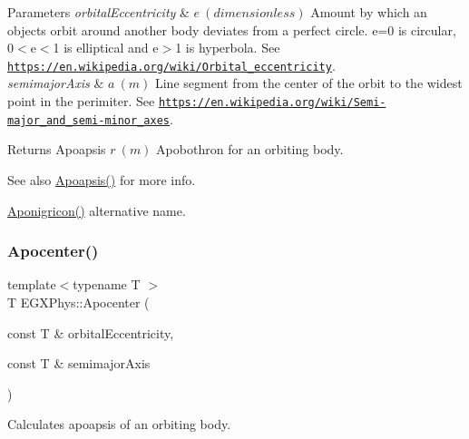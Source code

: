 \begin{DoxyParams}{Parameters}
{\em orbital\+Eccentricity} & $ e\ (dimensionless)$ Amount by which an objects orbit around another body deviates from a perfect circle. e=0 is circular, 0$<$e$<$1 is elliptical and e$>$1 is hyperbola. See \href{https://en.wikipedia.org/wiki/Orbital_eccentricity}{\tt https\+://en.\+wikipedia.\+org/wiki/\+Orbital\+\_\+eccentricity}. \\
\hline
{\em semimajor\+Axis} & $ a\ (m)$ Line segment from the center of the orbit to the widest point in the perimiter. See \href{https://en.wikipedia.org/wiki/Semi-major_and_semi-minor_axes}{\tt https\+://en.\+wikipedia.\+org/wiki/\+Semi-\/major\+\_\+and\+\_\+semi-\/minor\+\_\+axes}. \\
\hline
\end{DoxyParams}
\begin{DoxyReturn}{Returns}
Apoapsis $ r\ (m)$ Apobothron for an orbiting body. 
\end{DoxyReturn}
\begin{DoxySeeAlso}{See also}
\mbox{\hyperlink{group___e_g_x_phys-_apoapsis_gaf962e650bf84a568458e8eb39b1c61ba}{Apoapsis()}} for more info. 

\mbox{\hyperlink{group___e_g_x_phys-_apoapsis_ga83e866e2f887ff8eafbc3971d4cab8be}{Aponigricon()}} alternative name. 
\end{DoxySeeAlso}
\mbox{\label{group___e_g_x_phys-_apoapsis_ga5e51a53e2f974264bada34f159fdc948}} 
\subsubsection{\texorpdfstring{Apocenter()}{Apocenter()}}
{\footnotesize\ttfamily template$<$typename T $>$ \\
T E\+G\+X\+Phys\+::\+Apocenter (\begin{DoxyParamCaption}\item[{const T \&}]{orbital\+Eccentricity,  }\item[{const T \&}]{semimajor\+Axis }\end{DoxyParamCaption})}



Calculates apoapsis of an orbiting body. 


